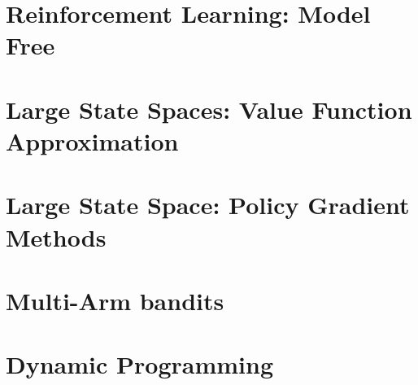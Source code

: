 \documentclass[12pt]{book}
\begin{document}
\chapter{Reinforcement Learning: Model Free}
\label{chapter:learning-model-free}


\chapter{Large State Spaces: Value Function Approximation}
\label{chapter:function-approximation}


\chapter{Large State Space: Policy Gradient Methods}
\label{chapter:policy-gradient}


\chapter{ Multi-Arm bandits}
\label{chapter:MAB}




% 

% 

% 

% 

\appendix

\chapter{Dynamic Programming}
\label{chapter:dp}




\end{document}
